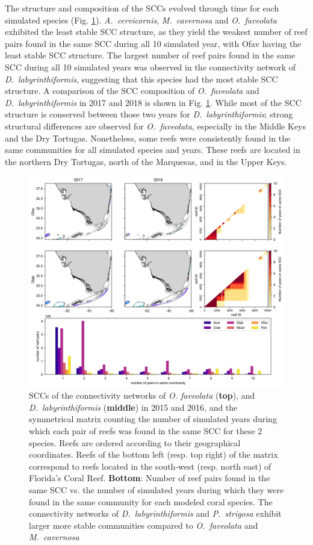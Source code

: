 \documentclass[preprint,12pt,authoryear]{elsarticle}
\begin{document}
The structure and composition of the SCCs evolved through time for each simulated species (Fig. \ref{fig:scc}). \textit{A.~cervicornis}, \textit{M.~cavernosa} and \textit{O.~faveolata} exhibited the least stable SCC structure, as they yield the weakest number of reef pairs found in the same SCC during all 10 simulated year, with Ofav having the least stable SCC structure. The largest number of reef pairs found in the same SCC during all 10 simulated years was observed in the connectivity network of \textit{D.~labyrinthiformis}, suggesting that this species had the most stable SCC structure. A comparison of the SCC composition of \textit{O.~faveolata} and \textit{D.~labyrinthiformis} in 2017 and 2018 is shown in Fig. \ref{fig:scc}. While most of the SCC structure is conserved between those two years for \textit{D.~labyrinthiformis}; strong structural differences are observed for \textit{O.~faveolata}, especially in the Middle Keys and the Dry Tortugas. Nonetheless, some reefs were consistently found in the same communities for all simulated species and years. These reefs are located in the northern Dry Tortugas, north of the Marquesas, and in the Upper Keys.

\begin{figure}
    \centering
    \includegraphics[width=\textwidth]{figures/comparison_sccs.png}
    \caption{SCCs of the connectivity networks of \textit{O. faveolata} (\textbf{top}), and \textit{D.~labyrinthiformis} (\textbf{middle}) in 2015 and 2016, and the symmetrical matrix counting the number of simulated years during which each pair of reefs was found in the same SCC for these 2 species. Reefs are ordered according to their geographical coordinates. Reefs of the bottom left (resp. top right) of the matrix correspond to reefs located in the south-west (resp. north east) of Florida's Coral Reef. \textbf{Bottom}: Number of reef pairs found in the same SCC vs. the number of simulated years during which they were found in the same community for each modeled coral species. The connectivity networks of \textit{D.~labyrinthiformis} and \textit{P.~strigosa} exhibit larger more stable communities compared to \textit{O.~faveolata} and \textit{M.~cavernosa}}\label{fig:scc}
\end{figure}
\end{document}
